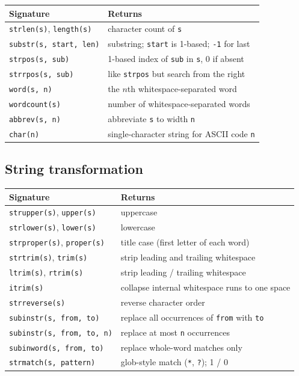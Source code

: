 \documentclass[11pt,letterpaper]{article}
\begin{document}
\begin{center}
\begin{tabular}{ll}
\toprule
Signature & Returns \\
\midrule
\texttt{strlen(s)}, \texttt{length(s)} & character count of \texttt{s} \\
\texttt{substr(s, start, len)} & substring; \texttt{start} is 1-based; \texttt{-1} for last \\
\texttt{strpos(s, sub)} & 1-based index of \texttt{sub} in \texttt{s}, 0 if absent \\
\texttt{strrpos(s, sub)} & like \texttt{strpos} but search from the right \\
\texttt{word(s, n)} & the $n$th whitespace-separated word \\
\texttt{wordcount(s)} & number of whitespace-separated words \\
\texttt{abbrev(s, n)} & abbreviate \texttt{s} to width \texttt{n} \\
\texttt{char(n)} & single-character string for ASCII code \texttt{n} \\
\bottomrule
\end{tabular}
\end{center}

\subsection{String transformation}

\begin{center}
\begin{tabular}{ll}
\toprule
Signature & Returns \\
\midrule
\texttt{strupper(s)}, \texttt{upper(s)} & uppercase \\
\texttt{strlower(s)}, \texttt{lower(s)} & lowercase \\
\texttt{strproper(s)}, \texttt{proper(s)} & title case (first letter of each word) \\
\texttt{strtrim(s)}, \texttt{trim(s)} & strip leading and trailing whitespace \\
\texttt{ltrim(s)}, \texttt{rtrim(s)} & strip leading / trailing whitespace \\
\texttt{itrim(s)} & collapse internal whitespace runs to one space \\
\texttt{strreverse(s)} & reverse character order \\
\texttt{subinstr(s, from, to)} & replace all occurrences of \texttt{from} with \texttt{to} \\
\texttt{subinstr(s, from, to, n)} & replace at most \texttt{n} occurrences \\
\texttt{subinword(s, from, to)} & replace whole-word matches only \\
\texttt{strmatch(s, pattern)} & glob-style match (\texttt{*}, \texttt{?}); 1 / 0 \\
\bottomrule
\end{tabular}
\end{center}
\end{document}
